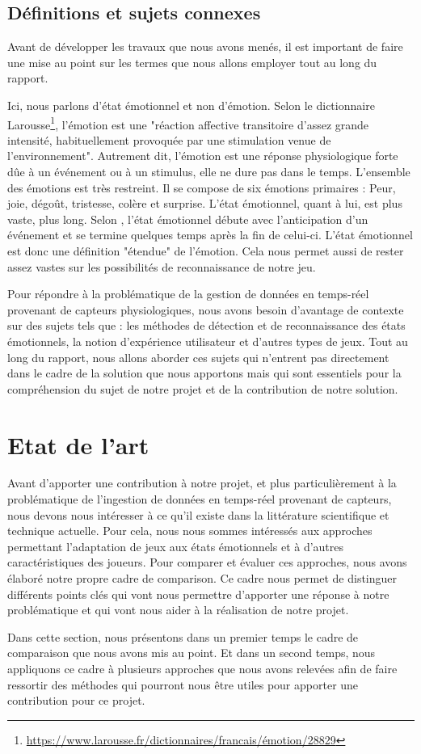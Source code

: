 \documentclass[11pt]{article}
\begin{document}
	\subsection{Définitions et sujets connexes}\label{sec:connexe}
		Avant de développer les travaux que nous avons menés, il est important de faire une mise au point sur les termes que nous allons employer tout au long du rapport.\par
		Ici, nous parlons d'état émotionnel et non d'émotion.
		Selon le dictionnaire Larousse\footnote{\href{https://www.larousse.fr/dictionnaires/francais/émotion/28829}{https://www.larousse.fr/dictionnaires/francais/émotion/28829}}, l'émotion est une "réaction affective transitoire d'assez grande intensité, habituellement provoquée par une stimulation venue de l'environnement". 
		Autrement dit, l'émotion est une réponse physiologique forte dûe à un événement ou à un stimulus, elle ne dure pas dans le temps.
		L'ensemble des émotions est très restreint.
		Il se compose de six émotions primaires : Peur, joie, dégoût, tristesse, colère et surprise. 
		L'état émotionnel, quant à lui, est plus vaste, plus long.
		Selon \cite{gal_2019}, l'état émotionnel débute avec l'anticipation d'un événement et se termine quelques temps après la fin de celui-ci.
		L'état émotionnel est donc une définition "étendue" de l'émotion.
		Cela nous permet aussi de rester assez vastes sur les possibilités de reconnaissance de notre jeu.\par
		Pour répondre à la problématique de la gestion de données en temps-réel provenant de capteurs physiologiques, nous avons besoin d'avantage de contexte sur des sujets tels que : les méthodes de détection et de reconnaissance des états émotionnels, la notion d'expérience utilisateur et d'autres types de jeux.
		Tout au long du rapport, nous allons aborder ces sujets qui n'entrent pas directement dans le cadre de la solution que nous apportons mais qui sont essentiels pour la compréhension du sujet de notre projet et de la contribution de notre solution.

\section{Etat de l'art}\label{sec:eda}
	Avant d'apporter une contribution à notre projet, et plus particulièrement à la problématique de l'ingestion de données en temps-réel provenant de capteurs, nous devons nous intéresser à ce qu'il existe dans la littérature scientifique et technique actuelle. 
	Pour cela, nous nous sommes intéressés aux approches permettant l'adaptation de jeux aux états émotionnels et à d'autres caractéristiques des joueurs.
	Pour comparer et évaluer ces approches, nous avons élaboré notre propre cadre de comparison.
	Ce cadre nous permet de distinguer différents points clés qui vont nous permettre d'apporter une réponse à notre problématique et qui vont nous aider à la réalisation de notre projet.\par
	Dans cette section, nous présentons dans un premier temps le cadre de comparaison que nous avons mis au point.
	Et dans un second temps, nous appliquons ce cadre à plusieurs approches que nous avons relevées afin de faire ressortir des méthodes qui pourront nous être utiles pour apporter une contribution pour ce projet.
\end{document}

